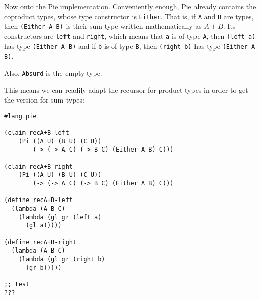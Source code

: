 \vspace{0.3cm}

Now onto the Pie implementation. Conveniently enough, Pie already contains
the coproduct types, whose type constructor is \texttt{Either}. That is,
if \texttt{A} and \texttt{B} are types, then \texttt{(Either A B)} is their
sum type written mathematically as $ A + B $. Its constructors are
\texttt{left} and \texttt{right}, which means that \texttt{a} is of type
\texttt{A}, then \texttt{(left a)} has type \texttt{(Either A B)}
and if \texttt{b} is of type \texttt{B}, then \texttt{(right b)} has
type \texttt{(Either A B)}.

Also, \texttt{Absurd} is the empty type.

This means we can readily adapt the recursor for product types in order to
get the version for sum types:
{
  \small
\begin{verbatim}
#lang pie

(claim recA+B-left
    (Pi ((A U) (B U) (C U))
        (-> (-> A C) (-> B C) (Either A B) C)))

(claim recA+B-right
    (Pi ((A U) (B U) (C U))
        (-> (-> A C) (-> B C) (Either A B) C)))

(define recA+B-left
  (lambda (A B C)
    (lambda (gl gr (left a)
      (gl a)))))

(define recA+B-right
  (lambda (A B C)
    (lambda (gl gr (right b)
      (gr b)))))

;; test
???
\end{verbatim}
}





